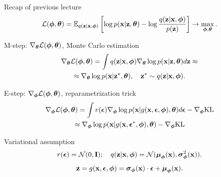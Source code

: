 

\usepackage{tikz}

\usetikzlibrary{arrows,shapes,positioning,shadows,trees}

\begin{frame}
\titlepage
\end{frame}
\begin{frame}{Recap of previous lecture}
	\vspace{-0.3cm}
	\[
		 \mathcal{L} (\bphi, \btheta)  = \mathbb{E}_{q(\bz | \bx, \bphi)} \left[\log p(\bx | \bz, \btheta) - \log \frac{q(\bz | \bx, \bphi)}{p(\bz)} \right] \rightarrow \max_{\bphi, \btheta}.
	\]	
	\vspace{-0.3cm}
	\begin{block}{M-step: $\nabla_{\btheta} \mathcal{L}(\bphi, \btheta)$, Monte Carlo estimation}
		\vspace{-0.8cm}
		\begin{multline*}
			\nabla_{\btheta} \mathcal{L} (\bphi, \btheta)
			= \int q(\bz|\bx, \bphi) \nabla_{\btheta}\log p(\bx|\bz, \btheta) d \bz \approx  \\
			\approx \nabla_{\btheta}\log p(\bx|\bz^*, \btheta), \quad \bz^* \sim q(\bz|\bx, \bphi).
		\end{multline*}
		\vspace{-0.7cm}
	\end{block}
	\begin{block}{E-step: $\nabla_{\bphi} \mathcal{L}(\bphi, \btheta)$, reparametrization trick}
		\vspace{-0.8cm}
		\begin{multline*}
			\nabla_{\bphi} \mathcal{L} (\bphi, \btheta) = \int r(\bepsilon) \nabla_{\bphi} \log p(\bx | g(\bx, \bepsilon, \bphi), \btheta) d\bepsilon  - \nabla_{\bphi} \text{KL}
			\\ \approx \nabla_{\bphi} \log p(\bx | g(\bx, \bepsilon^*, \bphi), \btheta)  - \nabla_{\bphi} \text{KL}
		\end{multline*}
		\vspace{-0.5cm}
	\end{block}
	\vspace{-0.5cm}
	
	\begin{block}{Variational assumption}
		\vspace{-0.3cm}
		\[
			r(\bepsilon) = \mathcal{N}(0, \bI); \quad  q(\bz| \bx, \bphi) = \mathcal{N} (\bmu_{\bphi}(\bx), \bsigma^2_{\bphi}(\bx)).
		\]
		\[
			\bz = g(\bx, \bepsilon, \bphi) = \bsigma_{\bphi}(\bx) \cdot \bepsilon + \bmu_{\bphi}(\bx).
		\]
	\end{block}
\end{frame}
